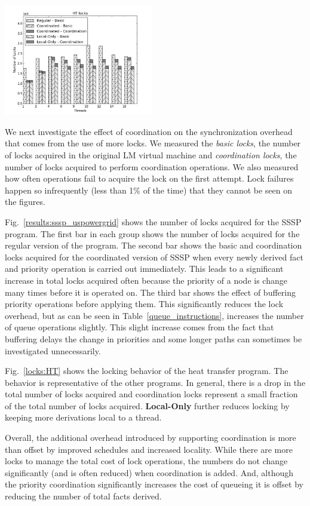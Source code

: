 \begin{topfig}
   \begin{center}
      \includegraphics[width=6.5cm]{results/locks/ht-locks.png}
   \end{center}
\end{topfig}

We next investigate the effect of coordination on the synchronization
overhead that comes from the use of more locks.  We measured the
\emph{basic locks}, the number of locks acquired
in the original LM virtual machine and \emph{coordination locks}, the
number of locks acquired to perform coordination operations.  We also
measured how often  operations fail to acquire
the lock on the first attempt.  Lock failures happen so infrequently
(less than 1\% of the time) that they cannot be seen on the figures.

Fig.~\ref{results:sssp_uspowergrid} shows the number of locks acquired
for the SSSP program.  The first bar in each group shows the number of
locks acquired for the regular version of the program.  The
second bar shows the basic and coordination locks acquired for the coordinated
version of SSSP when every newly derived fact and priority operation is carried out
immediately.  This leads to a significant increase in total locks
acquired often because the priority of a node is change many times
before it is operated on.  The third bar shows the effect of buffering
priority operations before applying them.  This significantly reduces
the lock overhead, but as can be seen in
Table~\ref{queue_instructions}, increases the number of queue operations
slightly.  This slight increase comes from the fact that buffering
delays the change in priorities and some longer paths can sometimes be
investigated unnecessarily.

Fig.~\ref{locks:HT} shows the locking behavior of the heat transfer
program.  The behavior is representative of the other programs. In general, there
is a drop in the total number of locks acquired and coordination locks
represent a small fraction of the total number of locks acquired. \textbf{Local-Only}
further reduces locking by keeping more derivations local to a thread.

Overall, the additional overhead introduced by supporting coordination
is more than offset by improved schedules and increased locality.
While there are more locks to manage the total cost of lock operations,
the numbers do not change significantly (and is often reduced) when coordination
is added.  And, although the priority coordination significantly
increases the cost of queueing it is offset by reducing the number of
total facts derived.
